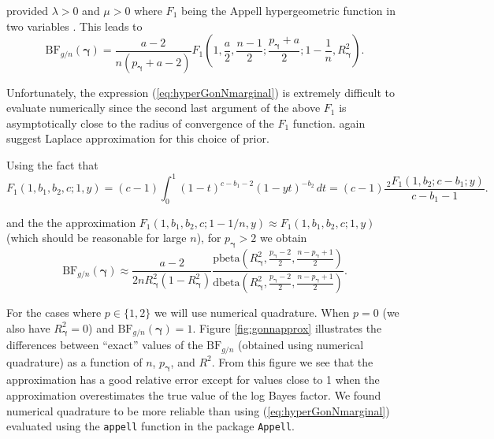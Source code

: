 \documentclass[12pt]{article}
\def\vectorfonttwo{\boldsymbol}
\def\vgamma{{\vectorfonttwo \gamma}}             %
\def\ds{\displaystyle}
\begin{document}
\noindent provided $\lambda>0$ and $\mu>0$
where
$F_1$ being the Appell hypergeometric function in two variables 
\cite{Weisstein2009}. This
leads to
\begin{equation}\label{eq:hyperGonNmarginal}
\ds \mbox{BF}_{g/n}(\vgamma) =  \frac{a - 2}{n(p_\vgamma + a - 2)} F_1\left( 1, \frac{a}{2}, \frac{n-1}{2}; \frac{p_\vgamma + a}{2}; 1  -  \frac{1}{n}, R_\vgamma^2 \right).
\end{equation}


Unfortunately, the expression (\ref{eq:hyperGonNmarginal}) is extremely
difficult to evaluate numerically since the second last argument of the above 
$F_1$ is asymptotically close to the radius of convergence of the $F_1$
function.
\cite{Liang2008} again suggest Laplace approximation 
for this choice of prior. 

Using the fact that
$$
F_1(1,b_1,b_2,c; 1,y) 
= (c - 1)
\int_0^1  (1-t)^{c-b_1-2} (1-yt)^{-b_2} \, dt
= (c - 1) \frac{\, _2F_1(1,b_2;c-b_1;y)}{c-b_1-1}.
$$
 
\noindent and the the approximation $F_1(1,b_1,b_2,c; 1-1/n,y)  \approx F_1(1,b_1,b_2,c; 1,y)$
(which should be reasonable for large $n$),
for $p_\vgamma > 2$ we obtain
\begin{equation}\label{eq:hyperGonNmarginalApprox}
\ds \mbox{BF}_{g/n}(\vgamma) 
\approx    
\frac{a - 2}{2n R_\vgamma^2(1 - R_\vgamma^2)}   \frac{
	\mbox{pbeta}\left( R_\vgamma^2, \frac{p_\vgamma-2}{2}, \frac{n-p_\vgamma+1}{2} \right)
}{
	\mbox{dbeta}\left( R_\vgamma^2, \frac{p_\vgamma-2}{2}, \frac{n-p_\vgamma+1}{2} \right)
}.
\end{equation}

\noindent For the cases where $p\in \{1,2\}$ we
will use numerical quadrature. When $p=0$ (we also have $R_\vgamma^2= 0$) and $\mbox{BF}_{g/n}(\vgamma) = 1$.
Figure \ref{fig:gonnapprox} illustrates the differences between ``exact'' values of the $\mbox{BF}_{g/n}$
(obtained using numerical quadrature) as a function of $n$, $p_\vgamma$, and $R^2$. From this figure we
see that the approximation has a good relative error except for values close to 1 when the approximation
overestimates the true value of the log Bayes factor. We found numerical quadrature to be more reliable
than using (\ref{eq:hyperGonNmarginal}) evaluated using the {\tt appell} function in the package 
{\tt Appell}.
\end{document}
